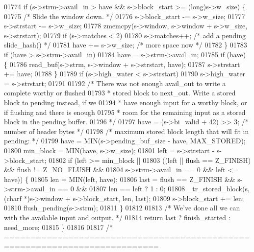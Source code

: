 \begin{DoxyCode}
{{{{{01774     \textcolor{keywordflow}{if} (s->strm->avail\_in > have && s->block\_start >= (\textcolor{keywordtype}{long})s->w\_size) \{
01775         \textcolor{comment}{/* Slide the window down. */}
01776         s->block\_start -= s->w\_size;
01777         s->strstart -= s->w\_size;
01778         zmemcpy(s->window, s->window + s->w\_size, s->strstart);
01779         \textcolor{keywordflow}{if} (s->matches < 2)
01780             s->matches++;           \textcolor{comment}{/* add a pending slide\_hash() */}
01781         have += s->w\_size;          \textcolor{comment}{/* more space now */}
01782     \}
01783     \textcolor{keywordflow}{if} (have > s->strm->avail\_in)
01784         have = s->strm->avail\_in;
01785     \textcolor{keywordflow}{if} (have) \{
01786         read\_buf(s->strm, s->window + s->strstart, have);
01787         s->strstart += have;
01788     \}
01789     \textcolor{keywordflow}{if} (s->high\_water < s->strstart)
01790         s->high\_water = s->strstart;
01791 
01792     \textcolor{comment}{/* There was not enough avail\_out to write a complete worthy or flushed}
01793 \textcolor{comment}{     * stored block to next\_out. Write a stored block to pending instead, if we}
01794 \textcolor{comment}{     * have enough input for a worthy block, or if flushing and there is enough}
01795 \textcolor{comment}{     * room for the remaining input as a stored block in the pending buffer.}
01796 \textcolor{comment}{     */}
01797     have = (s->bi\_valid + 42) >> 3;         \textcolor{comment}{/* number of header bytes */}
01798         \textcolor{comment}{/* maximum stored block length that will fit in pending: */}
01799     have = MIN(s->pending\_buf\_size - have, MAX\_STORED);
01800     min\_block = MIN(have, s->w\_size);
01801     left = s->strstart - s->block\_start;
01802     \textcolor{keywordflow}{if} (left >= min\_block ||
01803         ((left || flush == Z\_FINISH) && flush != Z\_NO\_FLUSH &&
01804          s->strm->avail\_in == 0 && left <= have)) \{
01805         len = MIN(left, have);
01806         last = flush == Z\_FINISH && s->strm->avail\_in == 0 &&
01807                len == left ? 1 : 0;
01808         \_tr\_stored\_block(s, (charf *)s->window + s->block\_start, len, last);
01809         s->block\_start += len;
01810         flush\_pending(s->strm);
01811     \}
01812 
01813     \textcolor{comment}{/* We've done all we can with the available input and output. */}
01814     \textcolor{keywordflow}{return} last ? finish\_started : need\_more;
01815 \}
01816 
01817 \textcolor{comment}{/* ===========================================================================}
}}}}}
\end{DoxyCode}
